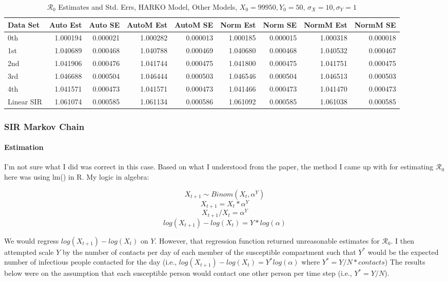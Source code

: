 \documentclass[12pt]{article}
\newcommand{\rr}{\ensuremath{\mathcal{R}_0}}
\begin{document}
\begin{table}[H]
	
	\caption{$\rr$ Estimates and Std. Errs, HARKO Model,
		Other Models, $X_0 = 99950, Y_0 = 50$, 
		$\sigma_X = 10, \sigma_Y = 1$}
	\begin{footnotesize}
		\hskip -1cm
		\begin{tabular}{l|r|r|r|r|r|r|r|r}
			\hline
			Data Set & Auto Est & Auto SE & AutoM Est & AutoM SE & Norm Est & Norm SE & NormM Est & NormM SE\\
			\hline
			0th & 1.000194 & 0.000021  & 1.000282 & 0.000013 & 1.000185 & 0.000015 & 1.000318 & 0.000018\\
			\hline
			1st & 1.040689 & 0.000468 & 1.040788 & 0.000469 & 1.040680 & 0.000468 & 1.040532 & 0.000467\\
			\hline
			2nd & 1.041906 & 0.000476 & 1.041744 & 0.000475 & 1.041800 & 0.000475 & 1.041751 & 0.000475\\
			\hline
			3rd & 1.046688 & 0.000504 & 1.046444 & 0.000503 & 1.046546 & 0.000504 & 1.046513 & 0.000503\\
			\hline
			4th & 1.041571 & 0.000473 & 1.041571 & 0.000473 & 1.041466 & 0.000473 & 1.041470 & 0.000473\\
			\hline
			Linear SIR & 1.061074 & 0.000585 & 1.061134 & 0.000586 & 1.061092 & 0.000585 & 1.061038 & 0.000585\\
			\hline
		\end{tabular}
	\end{footnotesize}
\end{table}

\subsubsection{SIR Markov Chain}

\paragraph{Estimation}

I'm not sure what I did was correct in this case. Based on what I understood from the paper, the method I came up with for estimating $\rr$ here was using lm() in R. My logic in algebra:

$$X_{t+1} \sim Binom(X_{t}, \alpha^Y)$$ $$ X_{t+1} = X_{t} * \alpha^Y$$ $$X _{t+1} / X_{t} = \alpha^Y$$ $$log(X _{t+1}) - log(X_{t}) = Y * log(\alpha)$$

We would regress $log(X _{t+1}) - log(X_{t})$ on $Y$. However, that regression function returned unreasonable estimates for $\rr$. I then attempted scale $Y$ by the number of contacts per day of each member of the susceptible compartment such that $Y^*$ would be the expected number of infectious people contacted for the day (i.e., $log(X _{t+1}) - log(X_{t}) = Y^* log(\alpha)$ where $Y^* = Y/N * contacts$) The results below were on the assumption that each susceptible person would contact one other person per time step (i.e., $Y^* = Y/N$).
\end{document}
